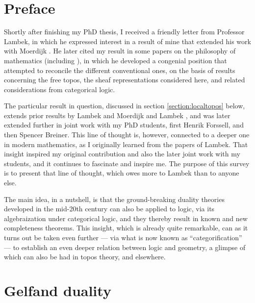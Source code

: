 \documentclass[lambek.tex]{subfiles}
\begin{document}
\section*{Preface}

Shortly after finishing my PhD thesis, I received a friendly letter from Professor Lambek, in which he expressed interest in a result of mine that extended his work with Moerdijk \cite{LM1982}. He later cited my result in some papers on the philosophy of mathematics (including \cite{L1989,L2004}), in which he developed a congenial  position that attempted to reconcile the different conventional ones, on the basis of results concerning the free topos, the sheaf representations considered here, and related considerations from categorical logic.    

The particular result in question, discussed in section \ref{section:localtopos} below, extends prior results by Lambek and Moerdijk \cite{LM} and Lambek \cite{L1989}, and was later extended further in joint work with my  PhD students, first Henrik Forssell, and then Spencer Breiner.  This line of thought is, however, connected to a deeper one in modern mathematics, as I originally learned from the papers of Lambek.  That insight inspired  my  original contribution and also the later joint work with my students, and it continues to fascinate and inspire me.   The purpose of this survey is to present that line of thought, which owes more to Lambek than to anyone else.  

The main idea, in a nutshell, is that the ground-breaking duality theories developed in the mid-20th century can also be applied to logic, via its algebraization under categorical logic, and they thereby result in known and new completeness theorems.  This insight, which is already quite remarkable, can as it turns out be taken even further --- via what is now known as ``categorification'' --- to establish an even deeper relation between logic and geometry, a glimpse of which can also be had in topos theory, and elsewhere.

\section{Gelfand duality}
\end{document}
